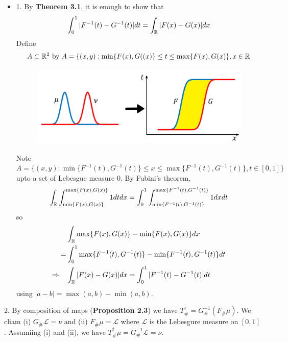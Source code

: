 \documentclass[12pt,a4paper]{article}
\newenvironment{proof}
{\begin{changemargin}{1cm}{0.5cm} 
	}%
	{\end{changemargin}
}
\renewenvironment{i}
{\begin{itemize} 
	}%
	{\end{itemize}
}
\newenvironment{p}
{\begin{proof} 
	}%
	{\end{proof}
}
\begin{document}
\begin{p}
\pf \begin{i}
\item[1.] By \textbf{Theorem 3.1}, it is enough to show that
\begin{align*}
\int_0^1 |F^{-1}(t) - G^{-1}(t)| dt = \int_{\mathbb{R}} |F(x) - G(x)|dx
\end{align*}
Define 
\begin{align*}
A\subset \mathbb{R}^2 \text{ by }A= \{(x,y) : \min \{F(x), G((x) \} \leq t \leq \max \{F(x), G(x) \}, x\in \mathbb{R}
\end{align*}

\begin{figure}[h]
\begin{center}
    \includegraphics[scale=0.15]{3}
\end{center}
\end{figure}

Note $A = \{(x,y) : \min \{F^{-1}(t), G^{-1}(t)\}\leq x\leq \max \{F^{-1}(t), G^{-1}(t)\}, t\in [0,1] \}$ upto a set of Lebesgue measure 0. By Fubini's theorem,
\begin{align*}
\int_{\mathbb{R}}\int_{\min \{F(x), G(x)\}}^{\max \{F(x), G(x)\}} 1 dtdx = \int_0^1 \int_{\min \{F^{-1}(t), G^{-1}(t)\}}^{\max \{F^{-1}(t), G^{-1}(t)\}} 1dxdt
\end{align*}
so
\begin{align*}
&\int_{\mathbb{R}} \max \{F(x), G(x)\} - \min \{F(x), G(x)\} dx \\
=&\int_0^1 \max \{F^{-1}(t), G^{-1}(t)\} - \min \{F^{-1}(t), G^{-1}(t)\} dt \\
\Rightarrow \quad &\int_{\mathbb{R}} |F(x)- G(x)| dx =\int_0^1 |F^{-1}(t) - G^{-1}(t)|dt
\end{align*}
using $|a-b| = \max (a,b) - \min(a,b)$.
\end{i}
\item[2.] By composition of maps (\textbf{Proposition 2.3}) we have $T_{\#}^{\dagger} = G_{\#}^{-1}(F_{\#}\mu)$. We cliam (i) $G_{\#} \mathscr{L} =\nu$ and (ii) $F_{\#} \mu = \mathscr{L}$ where $\mathscr{L}$ is the Lebesgure measure on $[0,1]$. Assumiing (i) and (ii), we have $T_{\#}^{\dagger} \mu = G_{\#}^{-1} \mathscr{L} =\nu$.


\end{p}
\end{document}
